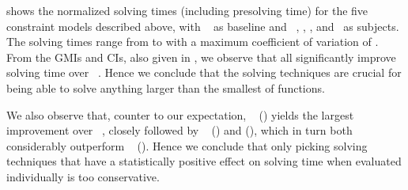  shows the normalized solving
times (including \gls{presolving} time) for the five \glspl{constraint model}
described above, with ~ as
\gls{baseline} and ~, ,
, and~ as \glspl{subject}.
%
The solving times range from
\printMinSolvingTime{
  \SolvTechEnableOnlyAllGoodPrePlusSolvingTimeSpeedupNonePrePlusSolvingTimeAvgMin,
  \SolvTechEnableOnlyAllGoodPrePlusSolvingTimeSpeedupPrePlusSolvingTimeAvgMin,
  \SolvTechDisableAllBadPrePlusSolvingTimeSpeedupPrePlusSolvingTimeAvgMin,
  \SolvTechDisableAllPrePlusSolvingTimeSpeedupPrePlusSolvingTimeAvgMin,
  \SolvTechBestCombosPrePlusSolvingTimeSpeedupPrePlusSolvingTimeAvgMin
} to
\printMaxSolvingTime{
  \SolvTechEnableOnlyAllGoodPrePlusSolvingTimeSpeedupNonePrePlusSolvingTimeAvgMax,
  \SolvTechEnableOnlyAllGoodPrePlusSolvingTimeSpeedupPrePlusSolvingTimeAvgMax,
  \SolvTechDisableAllBadPrePlusSolvingTimeSpeedupPrePlusSolvingTimeAvgMax,
  \SolvTechDisableAllPrePlusSolvingTimeSpeedupPrePlusSolvingTimeAvgMax,
  \SolvTechBestCombosPrePlusSolvingTimeSpeedupPrePlusSolvingTimeAvgMax
} with a maximum coefficient of variation of
\numMaxOf{
  \SolvTechEnableOnlyAllGoodPrePlusSolvingTimeSpeedupNonePrePlusSolvingTimeCvMax,
  \SolvTechEnableOnlyAllGoodPrePlusSolvingTimeSpeedupPrePlusSolvingTimeCvMax,
  \SolvTechDisableAllBadPrePlusSolvingTimeSpeedupPrePlusSolvingTimeCvMax,
  \SolvTechDisableAllPrePlusSolvingTimeSpeedupPrePlusSolvingTimeCvMax,
  \SolvTechBestCombosPrePlusSolvingTimeSpeedupPrePlusSolvingTimeCvMax
}.
%
From the \glspl{GMI} and \glspl{CI}, also given in
, we observe that all
 significantly improve solving time over
~.
%
Hence we conclude that the solving techniques are crucial for being able to
solve anything larger than the smallest of \glspl{function}.

We also observe that, counter to our expectation, ~ ()
yields the largest improvement over ~, closely followed by ~ () and
 (), which in turn
both considerably outperform ~
().
%
Hence we conclude that only picking solving techniques that have a statistically
positive effect on solving time when evaluated individually is too conservative.

